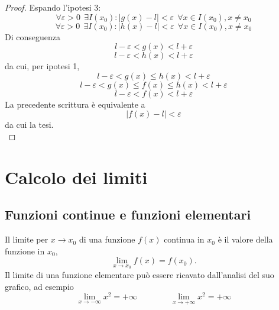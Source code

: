         \begin{proof}
            Espando l'ipotesi 3:
            \[\forall \varepsilon > 0 ~~\exists I(x_0) : |g(x)-l|<\varepsilon~~\forall x \in I(x_0), x\neq x_0\]
            \[\forall \varepsilon > 0 ~~\exists I(x_0) : |h(x)-l|<\varepsilon~~\forall x \in I(x_0), x\neq x_0\]
            Di conseguenza 
            \[l-\varepsilon < g(x) <l+\varepsilon\]
            \[l-\varepsilon < h(x) <l+\varepsilon\]
            da cui, per ipotesi 1, 
            \[l-\varepsilon < g(x)\leq h(x) <l+\varepsilon\]
            \[l-\varepsilon < g(x) \leq f(x) \leq h(x) <l+\varepsilon\]
            \[l-\varepsilon < f(x) <l+\varepsilon\]
            La precedente scrittura è equivalente a 
            \[|f(x)-l|<\varepsilon\]
            da cui la tesi.\\
        \end{proof}
\section{Calcolo dei limiti}
\subsection{Funzioni continue e funzioni elementari}
Il limite per $x\to x_0$ di una funzione $f(x)$ continua in $x_0$ è il valore della funzione in $x_0$, 
\[\lim_{x\to x_0}f(x) = f(x_0).\]
Il limite di una funzione elementare può essere ricavato dall'analisi del suo grafico, ad esempio
\[\lim_{x\to -\infty}x^2=+\infty \qquad \qquad \lim_{x\to +\infty}x^2=+\infty\]
